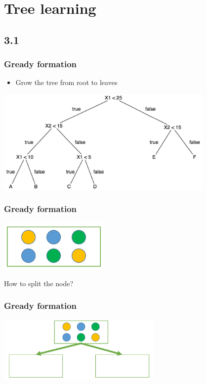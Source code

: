 \documentclass[default]{beamer}
\begin{document}
	\section{Tree learning}
	\subsection{3.1}
	\begin{frame}
		\frametitle{Gready formation}

		\Large
		\begin{itemize}
			\item Grow the tree from root to leaves
		\end{itemize}
		\par\bigskip
		\centering
		\includegraphics[width=0.8\textwidth]{trees13.jpg}
	\end{frame}

	\begin{frame}
		\frametitle{Gready formation}
		\centering
		\includegraphics[width=0.4\textwidth]{trees13.png}
		\par\bigskip
		\par\bigskip
		\par\bigskip
		
		\Large
		How to split the node?
	\end{frame}

	\begin{frame}
		\frametitle{Gready formation}
		\centering
		\includegraphics[width=0.6\textwidth]{trees14.png}
	\end{frame}
\end{document}
